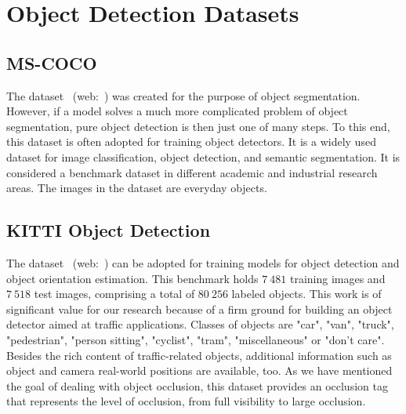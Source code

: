 \section{Object Detection Datasets}
\label{sec:ObjectDetectionDatasets}

\subsection{MS-COCO}
\label{ssec:DatasetMSCOCO}

The \mscoco{} dataset~\cite{lin2014mscoco} (web:~\cite{webmscocodataset}) was created for the purpose of object segmentation. However, if a model solves a much more complicated problem of object segmentation, pure object detection is then just one of many steps. To this end, this dataset is often adopted for training object detectors. It is a widely used dataset for image classification, object detection, and semantic segmentation. It is considered a benchmark dataset in different academic and industrial research areas. The images in the dataset are everyday objects.

\subsection{KITTI Object Detection}
\label{ssec:DatasetKITTIObjectDetection}

The  dataset~\cite{geiger2012cvpr} (web:~\cite{webkittiobjdetectiondataset}) can be adopted for training models for object detection and object orientation estimation. This benchmark holds $7\ 481$ training images and $7\ 518$ test images, comprising a total of $80\ 256$ labeled objects. This work is of significant value for our research because of a firm ground for building an object detector aimed at traffic applications. Classes of objects are "car", "van", "truck", "pedestrian", "person sitting", "cyclist", "tram", "miscellaneous" or "don't care". Besides the rich content of traffic-related objects, additional information such as object and camera real-world positions are available, too. As we have mentioned the goal of dealing with object occlusion, this dataset provides an occlusion tag that represents the level of occlusion, from full visibility to large occlusion.
